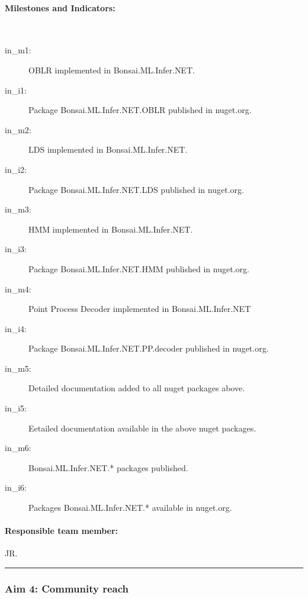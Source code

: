 \paragraph{Milestones and Indicators:}\mbox{}\\

\begin{description}

    \item[in\_m1:] OBLR implemented in Bonsai.ML.Infer.NET.

    \item[in\_i1:] Package Bonsai.ML.Infer.NET.OBLR published in nuget.org.

    \item[in\_m2:] LDS implemented in Bonsai.ML.Infer.NET.

    \item[in\_i2:] Package Bonsai.ML.Infer.NET.LDS published in nuget.org.

    \item[in\_m3:] HMM implemented in Bonsai.ML.Infer.NET.

    \item[in\_i3:] Package Bonsai.ML.Infer.NET.HMM published in nuget.org.

    \item[in\_m4:] Point Process Decoder implemented in Bonsai.ML.Infer.NET

    \item[in\_i4:] Package Bonsai.ML.Infer.NET.PP.decoder published in
        nuget.org.

    \item[in\_m5:] Detailed documentation added to all nuget packages above.

    \item[in\_i5:] Eetailed documentation available in the above nuget
        packages.

    \item[in\_m6:] Bonsai.ML.Infer.NET.* packages published.
    \item[in\_i6:] Packages Bonsai.ML.Infer.NET.* available in nuget.org.

\end{description}

\paragraph{Responsible team member:} JR.

\noindent\rule{\textwidth}{1pt}
\subsubsection{Aim 4: Community reach}

